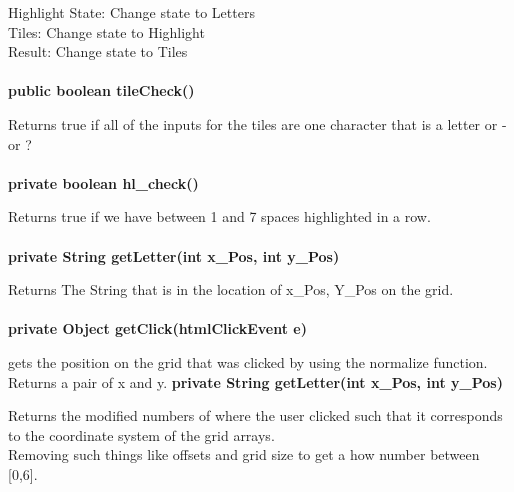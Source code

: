 \documentclass[11pt]{article}
\begin{document}
Highlight State: Change state to Letters\\

Tiles: Change state to Highlight\\

Result: Change state to Tiles\\\\
%
\textbf{public boolean tileCheck()\\}

Returns true if all of the inputs for the tiles are one character that is a letter or - or ?\\\\
%
\textbf{private boolean hl\_check()\\}

Returns true if we have between 1 and 7 spaces highlighted in a row.\\\\
%
\textbf{private String getLetter(int x\_Pos, int y\_Pos)\\}

Returns The String that is in the location of x\_Pos, Y\_Pos on the grid.\\\\
%
\textbf{private Object getClick(htmlClickEvent e)}

gets the position on the grid that was clicked by using the normalize function.\\ Returns a pair of x and y.
%
\textbf{private String getLetter(int x\_Pos, int y\_Pos)\\}

Returns the modified numbers of where the user clicked such that it corresponds to the coordinate system of the grid arrays.\\
Removing such things like offsets and grid size to get a how number between [0,6].
\end{document}
